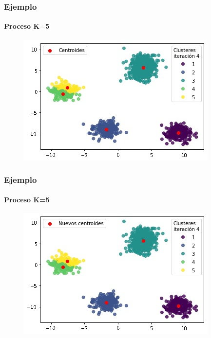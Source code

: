 \documentclass[
  shownotes,
  xcolor={svgnames},
  hyperref={colorlinks,citecolor=DarkBlue,linkcolor=DarkRed,urlcolor=DarkBlue}
  , aspectratio=169]{beamer}
\begin{document}
\begin{frame}
\frametitle{Ejemplo}
\framesubtitle{Proceso K=5}


\begin{figure}[H] \centering

    \centering
    \includegraphics[scale=.7]{figures/k5_5.jpg}
  \\
  \tiny
\end{figure}


\end{frame}
\begin{frame}
\frametitle{Ejemplo}
\framesubtitle{Proceso K=5}


\begin{figure}[H] \centering

    \centering
    \includegraphics[scale=.7]{figures/k5_6.jpg}
  \\
  \tiny
\end{figure}


\end{frame}
\end{document}

